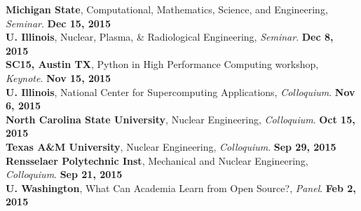 \documentclass[margin,line]{resume}
\begin{document}
\begin{resume}
      \textbf{Michigan State}, Computational, Mathematics, Science, and Engineering, \emph{Seminar}.  \hfill\textbf{Dec 15, 2015}\\
      \textbf{U. Illinois}, Nuclear, Plasma, \& Radiological Engineering, \emph{Seminar}.          \hfill\textbf{Dec 8, 2015}\\
      \textbf{SC15, Austin TX}, Python in High Performance Computing workshop, \emph{Keynote}.     \hfill\textbf{Nov 15, 2015}\\
      \textbf{U. Illinois}, National Center for Supercomputing Applications, \emph{Colloquium}.    \hfill\textbf{Nov 6, 2015}\\
      \textbf{North Carolina State University}, Nuclear Engineering, \emph{Colloquium}.            \hfill\textbf{Oct 15, 2015}\\
      \textbf{Texas A\&M University}, Nuclear Engineering, \emph{Colloquium}.                      \hfill\textbf{ Sep 29, 2015}\\
      \textbf{Rensselaer Polytechnic Inst}, Mechanical and Nuclear Engineering, \emph{Colloquium}. \hfill\textbf{Sep 21, 2015}\\
      \textbf{U. Washington}, What Can Academia Learn from Open Source?, \emph{Panel}.   \hfill\textbf{Feb 2, 2015}

\end{resume}
\end{document}
